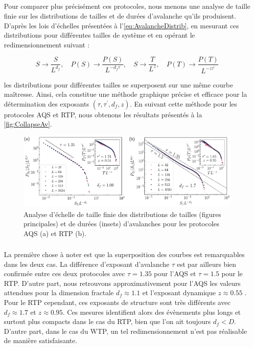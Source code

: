 \subparagraph{}Pour comparer plus précisément ces protocoles, nous menons une analyse de taille finie sur les distributions de tailles et de durées d'avalanche qu'ils produisent. D'après les lois d'échelles présentées à l'\autoref{eq:AvalancheDistrib}, en mesurant ces distributions pour différentes tailles de système et en opérant le redimensionnement suivant :

\begin{equation}
	S \rightarrow \frac{S}{L^{d_f}}, \quad P(S) \rightarrow \frac{P(S)}{L^{-d_f\tau}},\quad S \rightarrow \frac{T}{L^{z}}, \quad P(T) \rightarrow \frac{P(T)}{L^{-z\tau^\prime}}
\end{equation}

\noindent les distributions pour différentes tailles se superposent sur une même courbe maîtresse. Ainsi, cela constitue une méthode graphique précise et efficace pour la détermination des exposants $(\tau, \tau^\prime, d_f, z)$. En suivant cette méthode pour les protocoles AQS et RTP, nous obtenons les résultats présentés à la \autoref{fig:CollapseAv}.

\begin{figure}[h]
	\centering
	\includegraphics[width=\textwidth]{Chapitre4/Figures/Avalanches/Collapse.pdf}
	\caption{Analyse d'échelle de taille finie des distributions de tailles (figures principales) et de durées (insets) d'avalanches pour les protocoles AQS (a) et RTP (b).}
	\label{fig:CollapseAv}
\end{figure}

\subparagraph{}La première chose à noter est que la superposition des courbes est remarquables dans les deux cas. La différence d'exposant d'avalanche $\tau$ est par ailleurs bien confirmée entre ces deux protocoles avec $\tau = 1.35$ pour l'AQS et $\tau=1.5$ pour le RTP. D'autre part, nous retrouvons approximativement pour l'AQS les valeurs attendues pour la dimension fractale $d_f\approx 1.1$ et l'exposant dynamique $z\approx 0.55$ \cite{liu_driving_2016, lin_scaling_2014}. Pour le RTP cependant, ces exposants de structure sont très différents avec $d_f \approx 1.7$ et $z\approx 0.95$. Ces mesures identifient alors des évènements plus longs et surtout plus compacts dans le cas du RTP, bien que l'on ait toujours $d_f < D$. D'autre part, dans le cas du WTP, un tel redimensionnement n'est pas réalisable de manière satisfaisante.

